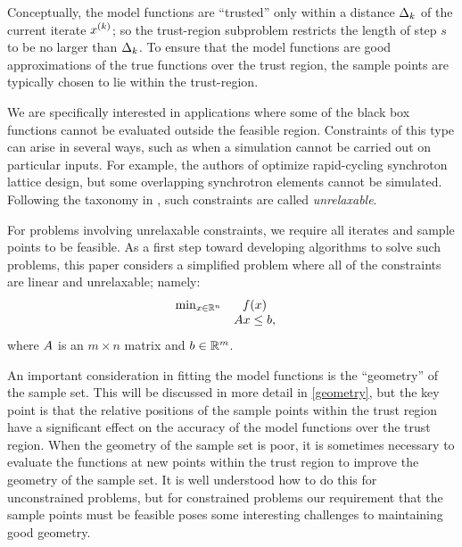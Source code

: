 \documentclass{article}
\begin{document}
Conceptually, the model functions are ``trusted'' only within a distance $ \Delta_k $ of the current iterate $x^{(k)}$; 
so the trust-region subproblem restricts the length of step $s$ to be no larger than $\Delta_k$.
To ensure that the model functions are good approximations of the true functions over the trust region, 
the sample points are typically chosen to lie within the trust-region.

%
We are specifically interested in applications where some of the black box functions cannot be evaluated outside the feasible region.  Constraints of this type can arise in several ways, such as when a simulation cannot be carried out on particular inputs.
For example, the authors of \cite{Padidar2021} optimize rapid-cycling synchroton lattice design,
but some overlapping synchrotron elements cannot be simulated.  Following the taxonomy in \cite{ledigabel2015taxonomy},  such constraints are called {\em unrelaxable}.    

For problems involving unrelaxable constraints,  we require all iterates and sample points to be feasible.    As a first step toward developing algorithms to solve such problems,  this paper considers a simplified problem where all of the constraints are linear and unrelaxable; namely:
\begin{align}
\begin{array}{ccl} \min_{x \in \mathbb R^n} & f(x) \\
& {A} x \le {b}, & 
\end{array}
\label{LD_dfo_problem}
\end{align}
where ${A}$ is an $m \times n$ matrix and ${b} \in \mathbb R^m$.


An important consideration in fitting the model functions is the ``geometry'' of the sample set.
This will be discussed in more detail in \cref{geometry}, but the key point is that the relative positions of the sample points within the trust region have a significant effect on the accuracy of the model functions over the trust region.
When the geometry of the sample set is poor, it is sometimes necessary to evaluate the functions at new points within the trust region to improve the geometry of the sample set.
It is well understood how to do this for unconstrained problems, but for constrained problems
our requirement that the sample points must be feasible poses some interesting challenges to maintaining good geometry.   
\end{document}
